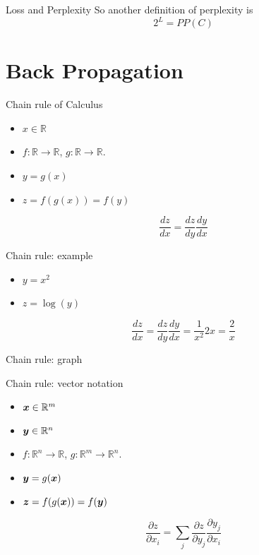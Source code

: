 \documentclass[10pt]{beamer}
\begin{document}
\begin{frame}{Loss and Perplexity}
So another definition of perplexity is
\vspace{0.5cm}
\Large{
\begin{equation*}
2^{L} = PP(C)
\end{equation*}
}
\end{frame}

\section{Back Propagation}

\begin{frame}{Chain rule of Calculus}
\Large{
\begin{itemize}
\item $x \in \mathbb{R}$
\item $f:\mathbb{R} \rightarrow\mathbb{R}$, $g:\mathbb{R} \rightarrow\mathbb{R}$. 
\item $y = g(x)$
\item $z = f(g(x)) = f(y)$
\end{itemize}

\[
\frac{dz}{dx} = \frac{dz}{dy} \frac{dy}{dx} 
\]
}
\end{frame}

\begin{frame}{Chain rule: example}
\Large{
\begin{itemize}
\item $y = x^2$

\vspace{0.3cm}

\item $z = \log(y)$
\end{itemize}

\vspace{0.5cm}

\[
\frac{dz}{dx} = \frac{dz}{dy} \frac{dy}{dx} = \frac{1}{x^2}2x = \frac{2}{x}
\]
}
\end{frame}

\begin{frame}{Chain rule: graph}

\end{frame}

\begin{frame}{Chain rule: vector notation}
\Large{
\begin{itemize}
\item $\bm{x} \in \mathbb{R}^{m}$
\item $\bm{y} \in \mathbb{R}^{n}$
\item $f:\mathbb{R}^{n} \rightarrow\mathbb{R}$, $g:\mathbb{R}^{m} \rightarrow\mathbb{R}^{n}$. 
\item $\bm{y} = g(\bm{x})$
\item $\bm{z} = f(g(\bm{x})) = f(\bm{y})$
\end{itemize}
\[
\frac{\partial z}{\partial x_{i}} =\sum_{j} \frac{\partial z}{\partial y_{j}} \frac{\partial y_{j}}{\partial x_{i}} 
\]
}
\end{frame}
\end{document}
